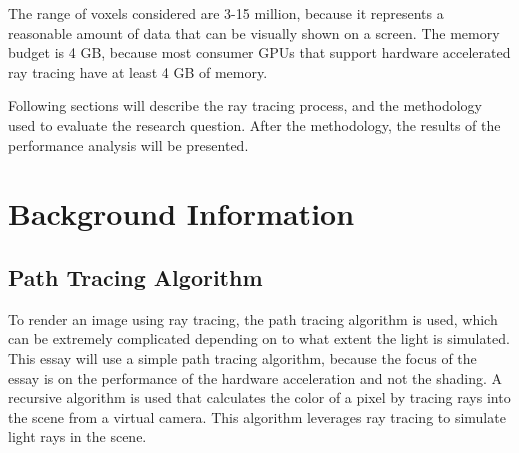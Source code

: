 \documentclass[12pt]{article}
\begin{document}
The range of voxels considered are 3-15 million, because it represents a reasonable amount of data that can be visually shown on a screen.
The memory budget is 4 GB, because most consumer GPUs that support hardware accelerated ray tracing have at least 4 GB of memory.

Following sections will describe the ray tracing process, and the methodology used to evaluate the research question.
After the methodology, the results of the performance analysis will be presented.

\section{Background Information}

\subsection{Path Tracing Algorithm}

To render an image using ray tracing, the path tracing algorithm is used, which can be extremely complicated depending on to what extent the light is simulated.
This essay will use a simple path tracing algorithm, because the focus of the essay is on the performance of the hardware acceleration and not the shading.
A recursive algorithm is used that calculates the color of a pixel by tracing rays into the scene from a virtual camera.
This algorithm leverages ray tracing to simulate light rays in the scene.
\end{document}
